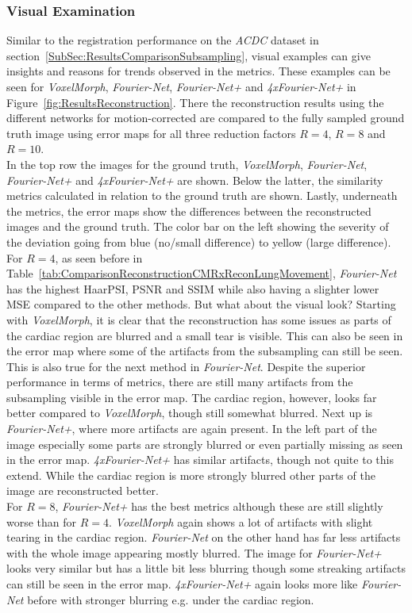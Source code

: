 \subsubsection{Visual Examination}
Similar to the registration performance on the \emph{ACDC} dataset in section~\ref{SubSec:ResultsComparisonSubsampling}, visual examples can give insights and reasons for trends observed in the metrics. These examples can be seen for \emph{VoxelMorph}, \emph{Fourier-Net}, \emph{Fourier-Net+} and \emph{4xFourier-Net+} in Figure~\ref{fig:ResultsReconstruction}. There the reconstruction results using the different networks for motion-corrected are compared to the fully sampled ground truth image using error maps for all three reduction factors $R=4$, $R=8$ and $R=10$.\\
In the top row the images for the ground truth, \emph{VoxelMorph}, \emph{Fourier-Net}, \emph{Fourier-Net+} and \emph{4xFourier-Net+} are shown. Below the latter, the similarity metrics calculated in relation to the ground truth are shown. Lastly, underneath the metrics, the error maps show the differences between the reconstructed images and the ground truth. The color bar on the left showing the severity of the deviation going from blue (no/small difference) to yellow (large difference).\\
For $R=4$, as seen before in Table~\ref{tab:ComparisonReconstructionCMRxReconLungMovement}, \emph{Fourier-Net} has the highest HaarPSI, PSNR and SSIM while also having a slighter lower MSE compared to the other methods. But what about the visual look? Starting with \emph{VoxelMorph}, it is clear that the reconstruction has some issues as parts of the cardiac region are blurred and a small tear is visible. This can also be seen in the error map where some of the artifacts from the subsampling can still be seen. This is also true for the next method in \emph{Fourier-Net}. Despite the superior performance in terms of metrics, there are still many artifacts from the subsampling visible in the error map. The cardiac region, however, looks far better compared to \emph{VoxelMorph}, though still somewhat blurred. Next up is \emph{Fourier-Net+}, where more artifacts are again present. In the left part of the image especially some parts are strongly blurred or even partially missing as seen in the error map. \emph{4xFourier-Net+} has similar artifacts, though not quite to this extend. While the cardiac region is more strongly blurred other parts of the image are reconstructed better.\\
For $R=8$, \emph{Fourier-Net+} has the best metrics although these are still slightly worse than for $R=4$. \emph{VoxelMorph} again shows a lot of artifacts with slight tearing in the cardiac region. \emph{Fourier-Net} on the other hand has far less artifacts with the whole image appearing mostly blurred. The image for \emph{Fourier-Net+} looks very similar but has a little bit less blurring though some streaking artifacts can still be seen in the error map. \emph{4xFourier-Net+} again looks more like \emph{Fourier-Net} before with stronger blurring e.g. under the cardiac region.\\
